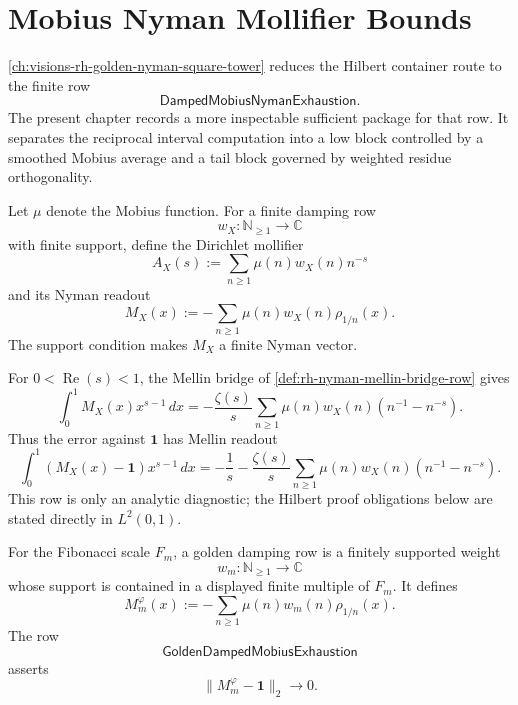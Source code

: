 \chapter{Mobius Nyman Mollifier Bounds}
\label{ch:visions-rh-mobius-nyman-mollifier-bounds}

\autoref{ch:visions-rh-golden-nyman-square-tower} reduces the Hilbert
container route to the finite row
$$
\mathsf{DampedMobiusNymanExhaustion}.
$$
The present chapter records a more inspectable sufficient package for
that row.  It separates the reciprocal interval computation into a low
block controlled by a smoothed Mobius average and a tail block governed
by weighted residue orthogonality.

\begin{definition}
\label{def:rh-dirichlet-mollifier-readout}
Let $\mu$ denote the Mobius function.  For a finite damping row
$$
w_X:\mathbb N_{\ge1}\to\mathbb C
$$
with finite support, define the Dirichlet mollifier
$$
A_X(s)
:=
\sum_{n\ge1}\mu(n)w_X(n)n^{-s}
$$
and its Nyman readout
$$
M_X(x)
:=
-
\sum_{n\ge1}\mu(n)w_X(n)\rho_{1/n}(x).
$$
The support condition makes $M_X$ a finite Nyman vector.
\end{definition}

\begin{definition}
\label{def:rh-mellin-mollifier-error-row}
For $0<\operatorname{Re}(s)<1$, the Mellin bridge of
\autoref{def:rh-nyman-mellin-bridge-row} gives
$$
\int_0^1 M_X(x)x^{s-1}\,dx
=
-
\frac{\zeta(s)}{s}
\sum_{n\ge1}\mu(n)w_X(n)(n^{-1}-n^{-s}).
$$
Thus the error against $\mathbf 1$ has Mellin readout
$$
\int_0^1 (M_X(x)-\mathbf 1)x^{s-1}\,dx
=
-
\frac{1}{s}
-
\frac{\zeta(s)}{s}
\sum_{n\ge1}\mu(n)w_X(n)(n^{-1}-n^{-s}).
$$
This row is only an analytic diagnostic; the Hilbert proof obligations
below are stated directly in $L^2(0,1)$.
\end{definition}

\begin{definition}
\label{def:rh-golden-damped-mobius-readout}
For the Fibonacci scale $F_m$, a golden damping row is a finitely
supported weight
$$
w_m:\mathbb N_{\ge1}\to\mathbb C
$$
whose support is contained in a displayed finite multiple of $F_m$.
It defines
$$
M_m^{\varphi}(x)
:=
-
\sum_{n\ge1}\mu(n)w_m(n)\rho_{1/n}(x).
$$
The row
$$
\mathsf{GoldenDampedMobiusExhaustion}
$$
asserts
$$
\|M_m^{\varphi}-\mathbf 1\|_2\to0.
$$
\end{definition}

